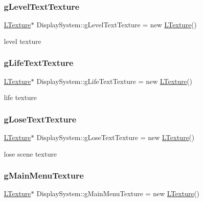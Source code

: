 \subsubsection{\texorpdfstring{g\+Level\+Text\+Texture}{gLevelTextTexture}}
{\footnotesize\ttfamily \mbox{\hyperlink{class_l_texture}{L\+Texture}}$\ast$ Display\+System\+::g\+Level\+Text\+Texture = new \mbox{\hyperlink{class_l_texture}{L\+Texture}}()\hspace{0.3cm}{\ttfamily [private]}}

level texture \mbox{\label{class_display_system_ac7d7bbb9cb0efd8948ec18979ad98c1d}} 
\subsubsection{\texorpdfstring{g\+Life\+Text\+Texture}{gLifeTextTexture}}
{\footnotesize\ttfamily \mbox{\hyperlink{class_l_texture}{L\+Texture}}$\ast$ Display\+System\+::g\+Life\+Text\+Texture = new \mbox{\hyperlink{class_l_texture}{L\+Texture}}()\hspace{0.3cm}{\ttfamily [private]}}

life texture \mbox{\label{class_display_system_a6899d775094d7a852159b553b0308107}} 
\subsubsection{\texorpdfstring{g\+Lose\+Text\+Texture}{gLoseTextTexture}}
{\footnotesize\ttfamily \mbox{\hyperlink{class_l_texture}{L\+Texture}}$\ast$ Display\+System\+::g\+Lose\+Text\+Texture = new \mbox{\hyperlink{class_l_texture}{L\+Texture}}()\hspace{0.3cm}{\ttfamily [private]}}

lose scene texture \mbox{\label{class_display_system_a4dcee3ea0ae2c8d65e07f00c5b061915}} 
\subsubsection{\texorpdfstring{g\+Main\+Menu\+Texture}{gMainMenuTexture}}
{\footnotesize\ttfamily \mbox{\hyperlink{class_l_texture}{L\+Texture}}$\ast$ Display\+System\+::g\+Main\+Menu\+Texture = new \mbox{\hyperlink{class_l_texture}{L\+Texture}}()\hspace{0.3cm}{\ttfamily [private]}}

